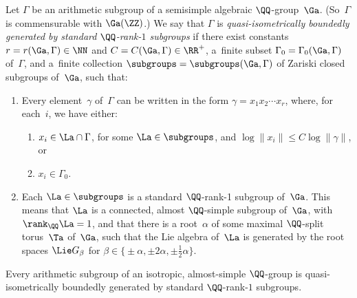 \begin{defn} \label{QIBddGenDefn}
Let $\Gamma$ be an arithmetic subgroup of a semisimple algebraic $\QQ$-group~$\Ga$. (So~$\Gamma$ is commensurable with $\Ga(\ZZ)$.) We say that $\Gamma$ is \emph{quasi-isometrically boundedly generated by standard $\QQ$-rank-$1$ subgroups} if there exist constants $r = r(\Ga,\Gamma) \in \NN$ and $C = C(\Ga,\Gamma) \in \RR^+$, a~finite subset $\Gamma_0 = \Gamma_0(\Ga,\Gamma)$ of~$\Gamma$, and a~finite collection $\subgroups = \subgroups(\Ga,\Gamma)$ of Zariski closed subgroups of~$\Ga$, such that:
\begin{enumerate}\itemsep=0pt
\item %
	 Every element~$\gamma$ of~$\Gamma$ can be written in the form $\gamma = x_1 x_2 \cdots x_r$, where, for each~$i$, we have either:
\begin{enumerate}\itemsep=0pt
\item %
$x_i \in \La \cap \Gamma$, for some $\La \in \subgroups$, and $\log \|x_i\| \le C \log \|\gamma\|$, or
\item $x_i \in \Gamma_0$.
\end{enumerate}
\item %
Each $\La \in \subgroups$ is a standard $\QQ$-rank-1 subgroup of~$\Ga$. This means that $\La$ is a connected, almost $\QQ$-simple subgroup of~$\Ga$, with $\rank_\QQ \La = 1$, and that there is a root~$\alpha$ of some maximal $\QQ$-split torus~$\Ta$ of~$\Ga$, such that the Lie algebra of~$\La$ is generated by the root spaces $\Lie G_\beta$ for $\beta \in \big\{{\pm} \alpha, \pm 2\alpha, \pm \frac{1}{2} \alpha \big\}$.
\end{enumerate}
\end{defn}

\begin{thm} \label{QIBddGenByRank1}Every arithmetic subgroup of an isotropic, almost-simple $\QQ$-group is quasi-isometrically boundedly generated by standard $\QQ$-rank-$1$ subgroups.
\end{thm}

